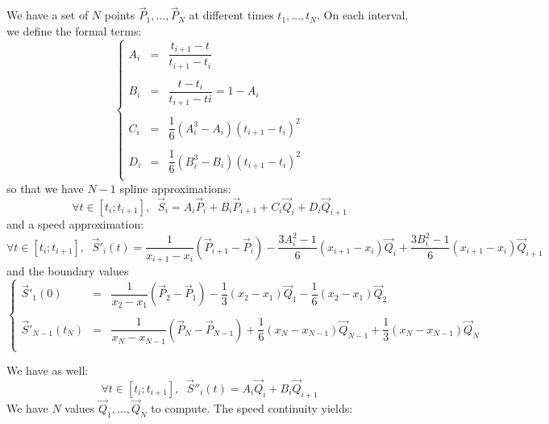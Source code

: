 \documentclass[aps,11pt]{revtex4}
\begin{document}
We have a set of $N$ points $\vec{P}_1,\ldots,\vec{P}_N$ at different times $t_1,\ldots,t_N$.
On each interval, we define the formal terms:
\begin{equation}
\left\lbrace
\begin{array}{rcl}
	A_i & = &\dfrac{t_{i+1}-t}{t_{i+1}-t_{i}}\\
	\\
	B_i & = &\dfrac{t-t_{i}}{t_{i+1}-t{i}} = 1-A_i\\
	\\
	C_i & = & \dfrac{1}{6}\left(A_i^3-A_i\right)\left(t_{i+1}-t_{i}\right)^2\\
	\\
	D_i & = & \dfrac{1}{6}\left(B_i^3-B_i\right)\left(t_{i+1}-t_{i}\right)^2\\
\end{array}
\right.
\end{equation}
so that we have  $N-1$ spline approximations:
\begin{equation}
	\forall t \in [t_{i};t_{i+1}], \;\; \vec{S}_i = A_i \vec{P}_{i} + B_i \vec{P}_{i+1} + C_i \vec{Q}_i + D_i \vec{Q}_{i+1}
\end{equation}
and a speed approximation:
\begin{equation}	
		\forall t \in [t_{i};t_{i+1}],
		 \;\; \vec{S}'_i(t) = 
		 \dfrac{1}{x_{i+1}-x_{i}} \left(\vec{P}_{i+1}-\vec{P}_i\right)
		  - \dfrac{3A_i^2-1}{6}(x_{i+1}-x_{i}) \vec{Q}_i
		  + \dfrac{3B_i^2-1}{6}(x_{i+1}-x_{i}) \vec{Q}_{i+1}
\end{equation}
and the boundary values
\begin{equation}
\left\lbrace
\begin{array}{rcl}
	\vec{S}'_1(0) & = & \dfrac{1}{x_{2}-x_{1}} \left(\vec{P}_{2}-\vec{P}_1\right)
		  - \dfrac{1}{3}(x_{2}-x_{1}) \vec{Q}_1
		  - \dfrac{1}{6}(x_{2}-x_{1}) \vec{Q}_{2}\\
		  \\
		 \vec{S}'_{N-1}(t_N) & = &  \dfrac{1}{x_{N}-x_{N-1}} \left(\vec{P}_{N}-\vec{P}_{N-1}\right)  + \dfrac{1}{6}(x_{N}-x_{N-1}) \vec{Q}_{N-1}
		  + \dfrac{1}{3}(x_{N}-x_{N-1}) \vec{Q}_{N} \\
\end{array}
\right.
\end{equation}

We have as well:
\begin{equation}	
		\forall t \in [t_{i};t_{i+1}],
		 \;\; \vec{S}''_i(t) = A_i \vec{Q}_i + B_i \vec{Q}_{i+1}
\end{equation}
We have $N$ values $\vec{Q}_1,\ldots,\vec{Q}_N$ to compute.
The speed continuity yields:
\end{document}
